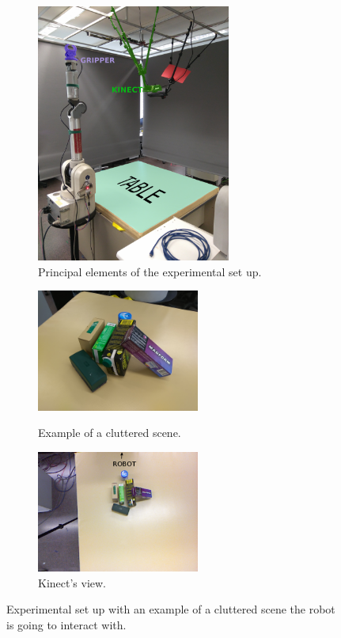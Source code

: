 \begin{figure}[tb]
\centering
\begin{subfigure}[b]{0.4\textwidth}
\includegraphics[height=8.5cm]{Img/set_up/set_up_nice2.png}
\caption{Principal elements of the experimental set up.}\label{fig:setup_}
\end{subfigure}
\qquad \qquad 
\begin{subfigure}[b]{0.4\textwidth}
\centering
\includegraphics[height=4cm]{Img/set_up/examplesetup.jpg}
\caption{Example of a cluttered scene.}\label{fig:example_scene}
\vspace{2ex}
\includegraphics[height=4cm]{Img/set_up/view_kinect2.png}
\caption{Kinect's view.}\label{fig:kinect_view}
\end{subfigure}
\caption{Experimental set up with an example of a cluttered scene the robot is going to interact with.}
\label{fig:setup}
\end{figure}

